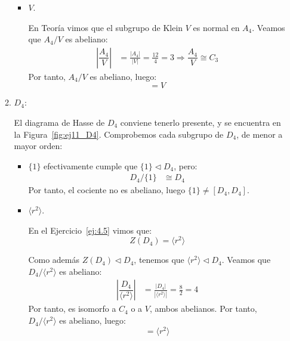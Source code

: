 \begin{ejercicio}
\begin{enumerate}
\begin{enumerate}
\begin{itemize}
                \item $V$.
                
                En Teoría vimos que el subgrupo de Klein $V$ es normal en $A_4$. Veamos que $A_4/V$ es abeliano:
                \begin{align*}
                    \left|\dfrac{A_4}{V}\right| &= \frac{|A_4|}{|V|} = \frac{12}{4} = 3
                    \Longrightarrow \dfrac{A_4}{V} \cong C_3
                \end{align*}
                Por tanto, $A_4/V$ es abeliano, luego:
                \begin{equation*}
                    [A_4,A_4] = V
                \end{equation*}               
            \end{itemize}

            \item $D_4$:
            
            El diagrama de Hasse de $D_4$ conviene tenerlo presente, y se encuentra en la Figura~\ref{fig:ej11_D4}. Comprobemos cada subgrupo de $D_4$, de menor a mayor orden:
            \begin{itemize}
                \item $\{1\}$ efectivamente cumple que $\{1\}\lhd D_4$, pero:
                \begin{align*}
                    D_4/\{1\} &\cong D_4
                \end{align*}
                Por tanto, el cociente no es abeliano, luego $\{1\}\neq [D_4,D_4]$.

                \item $\langle r^2\rangle$.
                
                En el Ejercicio~\ref{ej:4.5} vimos que:
                \begin{equation*}
                    Z(D_4) = \langle r^2\rangle
                \end{equation*}

                Como además $Z(D_4)\lhd D_4$, tenemos que $\langle r^2\rangle \lhd D_4$. Veamos que $D_4/\langle r^2\rangle$ es abeliano:
                \begin{align*}
                    \left|\dfrac{D_4}{\langle r^2\rangle}\right| &= \frac{|D_4|}{|\langle r^2\rangle|} = \frac{8}{2} = 4
                \end{align*}
                Por tanto, es isomorfo a $C_4$ o a $V$, ambos abelianos. Por tanto, $D_4/\langle r^2\rangle$ es abeliano, luego:
                \begin{equation*}
                    [D_4,D_4] = \langle r^2\rangle
                \end{equation*}
            \end{itemize}


\end{enumerate}
\end{enumerate}
\end{ejercicio}
